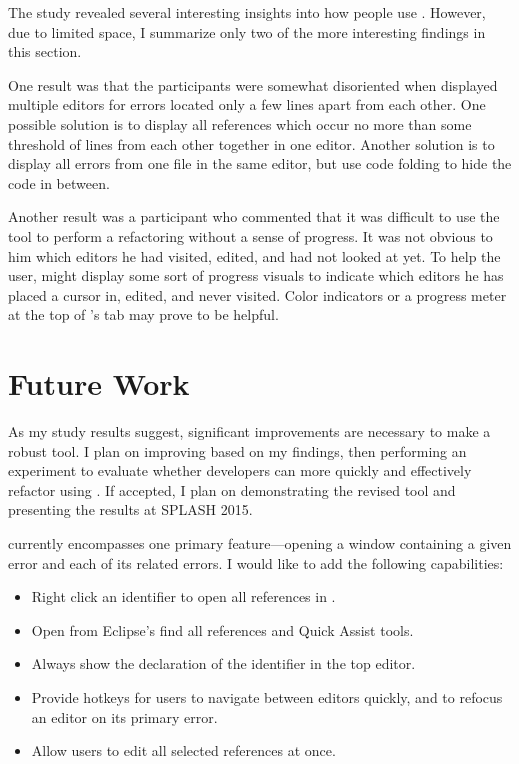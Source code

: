\documentclass{sigplanconf}
\begin{document}
The study revealed several interesting insights into how people use \pname{}.
However, due to limited space, I summarize only two of the more interesting
findings in this section.

One result was that the participants were somewhat disoriented when \pname{}
displayed multiple editors for errors located only a few lines apart from each
other. One possible solution is to display all references which occur no more
than some threshold of lines from each other together in one editor. Another
solution is to display all errors from one file in the same editor, but use code
folding to hide the code in between.

Another result was a participant who commented that it was difficult to use the
tool to perform a refactoring without a sense of progress. It was not obvious to
him which editors he had visited, edited, and had not looked at yet.  To help
the user, \pname{} might display some sort of progress visuals to indicate which
editors he has placed a cursor in, edited, and never visited.  Color indicators
or a progress meter at the top of \pname{}'s tab may prove to be helpful.

\section{Future Work}
As my study results suggest, significant improvements are necessary to make
\pname{} a robust tool. I plan on improving \pname{} based on my findings, then
performing an experiment to evaluate whether developers can more quickly and
effectively refactor using \pname{}. If accepted, I plan on demonstrating the
revised tool and presenting the results at SPLASH 2015.

\pname{} currently encompasses one primary feature---opening a window containing
a given error and each of its related errors. I would like to add the following
capabilities:

\begin{itemize}
  \item Right click an identifier to open all references in \pname{}.
  \item Open \pname{} from Eclipse's find all references and Quick Assist tools.
  \item Always show the declaration of the identifier in the top editor.
  \item Provide hotkeys for users to navigate between editors quickly, and to
      refocus an editor on its primary error.
  \item Allow users to edit all selected references at once.
\end{itemize}
\end{document}
